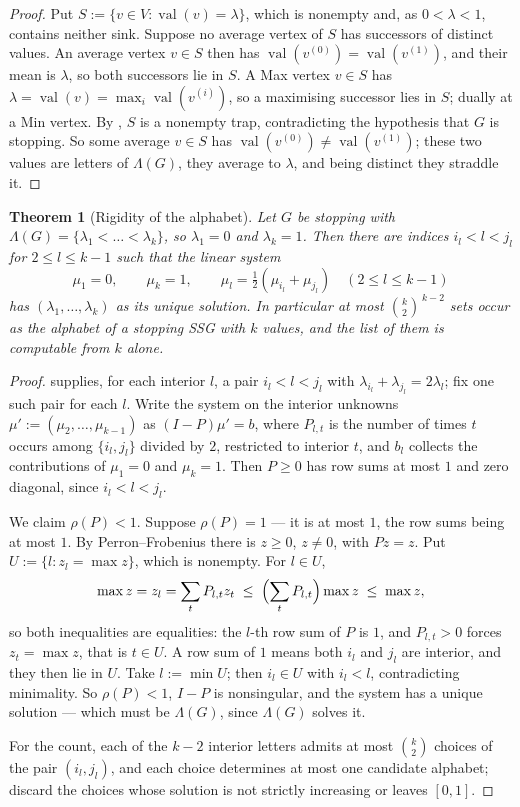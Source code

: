 \documentclass[11pt]{article}
\theoremstyle{plain}
\newtheorem{theorem}{Theorem}[section]
\theoremstyle{definition}
\DeclareMathOperator{\val}{val}
\begin{document}
\begin{proof}
Put $S:=\{v\in V:\val(v)=\lambda\}$, which is nonempty and, as
$0<\lambda<1$, contains neither sink. Suppose no average vertex of $S$ has
successors of distinct values. An average vertex $v\in S$ then has
$\val(v^{(0)})=\val(v^{(1)})$, and their mean is $\lambda$, so both
successors lie in $S$. A Max vertex $v\in S$ has
$\lambda=\val(v)=\max_i\val(v^{(i)})$, so a maximising successor lies in
$S$; dually at a Min vertex. By , $S$ is a nonempty
trap, contradicting the hypothesis that $G$ is stopping. So some average
$v\in S$ has $\val(v^{(0)})\ne\val(v^{(1)})$; these two values are letters
of $\Lambda(G)$, they average to $\lambda$, and being distinct they
straddle it.
\end{proof}

\begin{theorem}[Rigidity of the alphabet]\label{thm:alphabet-rigid}
Let $G$ be stopping with $\Lambda(G)=\{\lambda_1<\dots<\lambda_k\}$, so
$\lambda_1=0$ and $\lambda_k=1$. Then there are indices
$i_l<l<j_l$ for $2\le l\le k-1$ such that the linear system
\[
  \mu_1=0,\qquad \mu_k=1,\qquad
  \mu_l=\tfrac12(\mu_{i_l}+\mu_{j_l})\quad(2\le l\le k-1)
\]
has $(\lambda_1,\dots,\lambda_k)$ as its \emph{unique} solution. In
particular at most $\binom{k}{2}^{\,k-2}$ sets occur as the alphabet of a
stopping SSG with $k$ values, and the list of them is computable from $k$
alone.
\end{theorem}

\begin{proof}
 supplies, for each interior $l$, a pair
$i_l<l<j_l$ with $\lambda_{i_l}+\lambda_{j_l}=2\lambda_l$; fix one such
pair for each $l$. Write the system on the interior unknowns
$\mu':=(\mu_2,\dots,\mu_{k-1})$ as $(I-P)\mu'=b$, where $P_{l,t}$ is the
number of times $t$ occurs among $\{i_l,j_l\}$ divided by $2$, restricted
to interior $t$, and $b_l$ collects the contributions of $\mu_1=0$ and
$\mu_k=1$. Then $P\ge0$ has row sums at most $1$ and zero diagonal, since
$i_l<l<j_l$.

We claim $\rho(P)<1$. Suppose $\rho(P)=1$ --- it is at most $1$, the row sums
being at most $1$. By Perron--Frobenius there is $z\ge0$, $z\ne0$, with
$Pz=z$. Put $U:=\{l:z_l=\max z\}$, which is nonempty. For $l\in U$,
\[
  \max z=z_l=\sum_tP_{l,t}z_t\;\le\;\Bigl(\sum_tP_{l,t}\Bigr)\max z\;\le\;\max z,
\]
so both inequalities are equalities: the $l$-th row sum of $P$ is $1$, and
$P_{l,t}>0$ forces $z_t=\max z$, that is $t\in U$. A row sum of $1$ means both
$i_l$ and $j_l$ are interior, and they then lie in $U$. Take $l:=\min U$;
then $i_l\in U$ with $i_l<l$, contradicting minimality. So $\rho(P)<1$, $I-P$ is nonsingular,
and the system has a unique solution --- which must be $\Lambda(G)$, since
$\Lambda(G)$ solves it.

For the count, each of the $k-2$ interior letters admits at most
$\binom{k}{2}$ choices of the pair $(i_l,j_l)$, and each choice determines
at most one candidate alphabet; discard the choices whose solution is not
strictly increasing or leaves $[0,1]$.
\end{proof}
\end{document}
